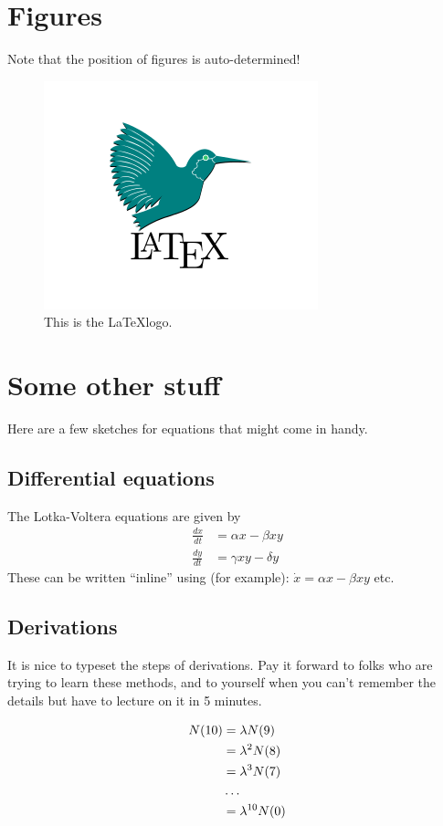 \documentclass[12pt,letterpaper]{article}
\begin{document}
\section{Figures}
Note that the position of figures is auto-determined!

\begin{figure}
	\centering
	\includegraphics[width=0.2\linewidth]{figs/LaTeX_logo.png}
	\caption{This is the \LaTeX logo.}
	\label{fig:logo}
\end{figure}


\section{Some other stuff}

Here are a few sketches for equations that might come in handy.

\subsection*{Differential equations}
The Lotka-Voltera equations are given by
\begin{align}
\frac{dx}{dt} 	&=	\alpha x - \beta xy \\
\frac{dy}{dt}	&=	\gamma xy - \delta y
\end{align}
These can be written ``inline'' using (for example): $\dot x = \alpha x - \beta xy$ etc.

\subsection*{Derivations}
It is nice to typeset the steps of derivations. Pay it forward to folks who are trying to learn these methods, and to yourself when you can't remember the details but have to lecture on it in 5 minutes.

\begin{align}
N(10) 	&= 	\lambda N(9) 		\\ 		\notag
		&= 	\lambda^2 N(8) 	\\		\notag
		&=	\lambda^3 N(7) 	\\		\notag
		& \dots				\\		\notag
		&=	\lambda^{10} N(0)	\\		\notag
\end{align}
\end{document}
